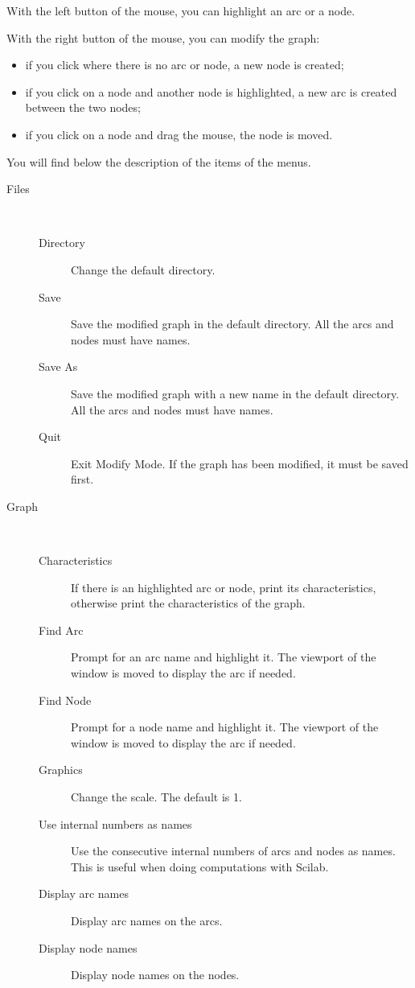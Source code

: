 \documentclass[11pt]{article}
\begin{document}
With the left button of the mouse, you can highlight an arc or a node.

With the right button of the mouse, you can modify the graph:
\begin{itemize}
\item if you click where there is no arc or node, a new node is created;
\item if you click on a node and another node is highlighted, a new
	arc is created between the two nodes;
\item if you click on a node and drag the mouse, the node is moved.
\end{itemize}

You will find below the description of the items of the menus.

\begin{description}
\item[Files]\ 
\begin{description}
  \item[Directory] Change the default directory.
  \item[Save] Save the modified graph in the default directory. All 
	the arcs and nodes must have names.
  \item[Save As] Save the modified graph with a new name in the
	default directory.
	All the arcs and nodes must have names.
  \item[Quit] Exit Modify Mode. If the graph has been
	modified, it must be saved first.
\end{description}
\item[Graph]\ 
\begin{description}
  \item[Characteristics] If there is an highlighted arc or node, print its
	characteristics, otherwise print the characteristics 
	of the graph.
  \item[Find Arc] Prompt for an arc name and highlight it. The viewport of the
	window is moved to display the arc if needed.
  \item[Find Node]  Prompt for a node name and highlight it. The
	viewport of the window is moved to display the arc if needed.
  \item[Graphics] Change the scale. The default is 1.
  \item[Use internal numbers as names] Use the consecutive internal numbers of
	arcs and nodes as names. This is useful 
	when doing computations with Scilab.
  \item[Display arc names] Display arc names on the arcs.
  \item[Display node names] Display node names on the nodes.

\end{description}
\end{description}
\end{document}
